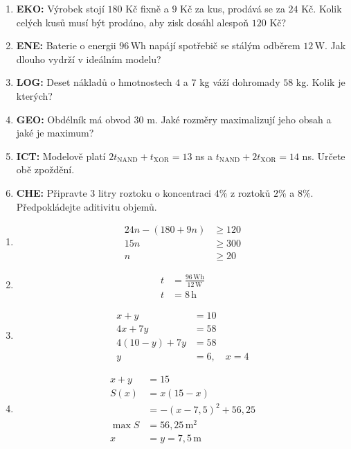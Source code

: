 \documentclass[11pt,a4paper]{article}
\begin{document}
\begin{zadaniReseniBox}[title={Domácí úkol}]
\begin{enumerate}[label=\alph*),itemsep=2pt]
\item \textbf{EKO:} Výrobek stojí $180$ Kč fixně a $9$ Kč za kus, prodává se za $24$ Kč. Kolik celých kusů musí být prodáno, aby zisk dosáhl alespoň $120$ Kč?
\item \textbf{ENE:} Baterie o energii $96\,\mathrm{Wh}$ napájí spotřebič se stálým odběrem $12\,\mathrm W$. Jak dlouho vydrží v ideálním modelu?
\item \textbf{LOG:} Deset nákladů o hmotnostech $4$ a $7$ kg váží dohromady $58$ kg. Kolik je kterých?
\item \textbf{GEO:} Obdélník má obvod $30$ m. Jaké rozměry maximalizují jeho obsah a jaké je maximum?
\item \textbf{ICT:} Modelově platí $2t_{\mathrm{NAND}}+t_{\mathrm{XOR}}=13$ ns a $t_{\mathrm{NAND}}+2t_{\mathrm{XOR}}=14$ ns. Určete obě zpoždění.
\item \textbf{CHE:} Připravte $3$ litry roztoku o koncentraci $4\%$ z roztoků $2\%$ a $8\%$. Předpokládejte aditivitu objemů.
\end{enumerate}
\tcblower
\begin{enumerate}[label=\alph*),itemsep=2pt]
\item
\[
\begin{aligned}
24n-(180+9n)&\ge120\\
15n&\ge300\\
n&\ge20
\end{aligned}
\]
\item
\[
\begin{aligned}
t&=\frac{96\,\mathrm{Wh}}{12\,\mathrm W}\\
t&=8\,\mathrm h
\end{aligned}
\]
\item
\[
\begin{aligned}
x+y&=10\\
4x+7y&=58\\
4(10-y)+7y&=58\\
y&=6,\quad x=4
\end{aligned}
\]
\item
\[
\begin{aligned}
x+y&=15\\
S(x)&=x(15-x)\\
&=-(x-7{,}5)^2+56{,}25\\
\max S&=56{,}25\,\mathrm{m^2}\\
x&=y=7{,}5\,\mathrm m
\end{aligned}
\]
\end{enumerate}
\end{zadaniReseniBox}
\end{document}
